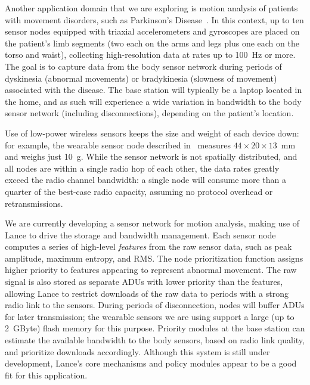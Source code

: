 Another application domain that we are exploring is motion
analysis of patients with movement disorders, such as Parkinson's
Disease~\cite{parkinsons-embs07}. In this context, up to ten sensor nodes
equipped with triaxial accelerometers and gyroscopes are placed on the
patient's limb segments (two each on the arms and legs plus one each
on the torso and waist), collecting high-resolution data at rates up to 100~Hz
or more. The goal is to capture data from the body
sensor network during periods of dyskinesia (abnormal movements) or
bradykinesia (slowness of movement) associated with the disease. 
The base station will typically 
be a laptop located in the home, and as such will experience a wide 
variation in bandwidth to the body sensor network (including
disconnections), depending on the patient's location.

Use of low-power wireless sensors keeps the size and weight
of each device down: for example, the wearable sensor node described
in~\cite{parkinsons-embs07} measures $44 \times 20 \times 13$~mm and
weighs just 10~g. 
While the sensor network is not spatially distributed, and
all nodes are within a single radio hop of each other, the data rates
greatly exceed the radio channel bandwidth: a single node will 
consume more than a quarter of the best-case radio capacity, assuming
no protocol overhead or retransmissions. 

We are currently developing a sensor network for motion analysis,
making use of Lance to drive the storage and bandwidth management.
Each sensor node computes a series of high-level {\em features} from
the raw sensor data, such as peak amplitude, maximum entropy, and
RMS. The node prioritization function assigns higher priority to 
features appearing to represent abnormal movement. The raw signal 
is also stored as separate ADUs with lower priority than the features,
allowing Lance to restrict downloads of the raw data to periods
with a strong radio link to the sensors. During periods of
disconnection, nodes will buffer ADUs for later transmission; the
wearable sensors we are using support a large (up to 2~GByte) flash
memory for this purpose. Priority modules at the base station can 
estimate the available bandwidth to the body sensors, based on radio
link quality, and prioritize downloads accordingly. Although this
system is still under development, Lance's core mechanisms and policy
modules appear to be a good fit for this application.

